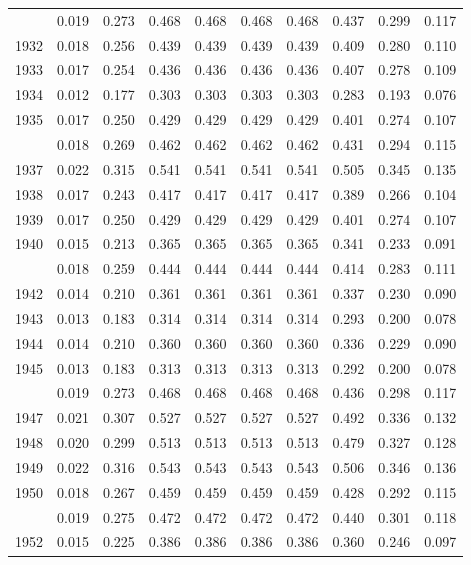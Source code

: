 \documentclass[
]{article}
\begin{document}
\begin{longtable}[t]{lrrrrrrrrr}
\endfoot
\bottomrule
\endlastfoot
1931 & 0.019 & 0.273 & 0.468 & 0.468 & 0.468 & 0.468 & 0.437 & 0.299 & 0.117\\
1932 & 0.018 & 0.256 & 0.439 & 0.439 & 0.439 & 0.439 & 0.409 & 0.280 & 0.110\\
1933 & 0.017 & 0.254 & 0.436 & 0.436 & 0.436 & 0.436 & 0.407 & 0.278 & 0.109\\
1934 & 0.012 & 0.177 & 0.303 & 0.303 & 0.303 & 0.303 & 0.283 & 0.193 & 0.076\\
1935 & 0.017 & 0.250 & 0.429 & 0.429 & 0.429 & 0.429 & 0.401 & 0.274 & 0.107\\
\addlinespace
1936 & 0.018 & 0.269 & 0.462 & 0.462 & 0.462 & 0.462 & 0.431 & 0.294 & 0.115\\
1937 & 0.022 & 0.315 & 0.541 & 0.541 & 0.541 & 0.541 & 0.505 & 0.345 & 0.135\\
1938 & 0.017 & 0.243 & 0.417 & 0.417 & 0.417 & 0.417 & 0.389 & 0.266 & 0.104\\
1939 & 0.017 & 0.250 & 0.429 & 0.429 & 0.429 & 0.429 & 0.401 & 0.274 & 0.107\\
1940 & 0.015 & 0.213 & 0.365 & 0.365 & 0.365 & 0.365 & 0.341 & 0.233 & 0.091\\
\addlinespace
1941 & 0.018 & 0.259 & 0.444 & 0.444 & 0.444 & 0.444 & 0.414 & 0.283 & 0.111\\
1942 & 0.014 & 0.210 & 0.361 & 0.361 & 0.361 & 0.361 & 0.337 & 0.230 & 0.090\\
1943 & 0.013 & 0.183 & 0.314 & 0.314 & 0.314 & 0.314 & 0.293 & 0.200 & 0.078\\
1944 & 0.014 & 0.210 & 0.360 & 0.360 & 0.360 & 0.360 & 0.336 & 0.229 & 0.090\\
1945 & 0.013 & 0.183 & 0.313 & 0.313 & 0.313 & 0.313 & 0.292 & 0.200 & 0.078\\
\addlinespace
1946 & 0.019 & 0.273 & 0.468 & 0.468 & 0.468 & 0.468 & 0.436 & 0.298 & 0.117\\
1947 & 0.021 & 0.307 & 0.527 & 0.527 & 0.527 & 0.527 & 0.492 & 0.336 & 0.132\\
1948 & 0.020 & 0.299 & 0.513 & 0.513 & 0.513 & 0.513 & 0.479 & 0.327 & 0.128\\
1949 & 0.022 & 0.316 & 0.543 & 0.543 & 0.543 & 0.543 & 0.506 & 0.346 & 0.136\\
1950 & 0.018 & 0.267 & 0.459 & 0.459 & 0.459 & 0.459 & 0.428 & 0.292 & 0.115\\
\addlinespace
1951 & 0.019 & 0.275 & 0.472 & 0.472 & 0.472 & 0.472 & 0.440 & 0.301 & 0.118\\
1952 & 0.015 & 0.225 & 0.386 & 0.386 & 0.386 & 0.386 & 0.360 & 0.246 & 0.097\\

\end{longtable}
\end{document}
